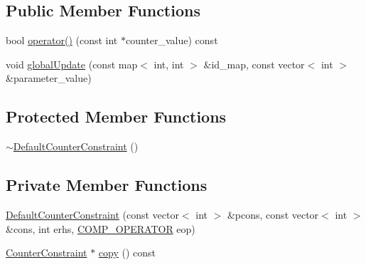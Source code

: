 \subsection*{Public Member Functions}
\begin{DoxyCompactItemize}
\item 
bool \mbox{\hyperlink{classgraphsat_1_1_default_counter_constraint_a0c7e9fd0402b59afdebfbc1764867aaa}{operator()}} (const int $\ast$counter\+\_\+value) const
\item 
void \mbox{\hyperlink{classgraphsat_1_1_default_counter_constraint_a5f131f57aa2685073391c372405322dd}{global\+Update}} (const map$<$ int, int $>$ \&id\+\_\+map, const vector$<$ int $>$ \&parameter\+\_\+value)
\end{DoxyCompactItemize}
\subsection*{Protected Member Functions}
\begin{DoxyCompactItemize}
\item 
\mbox{\hyperlink{classgraphsat_1_1_default_counter_constraint_aafe9f228a3ea6a39fc70ece8b9300875}{$\sim$\+Default\+Counter\+Constraint}} ()
\end{DoxyCompactItemize}
\subsection*{Private Member Functions}
\begin{DoxyCompactItemize}
\item 
\mbox{\hyperlink{classgraphsat_1_1_default_counter_constraint_ae77bcab173109e73923e98a5d1694d70}{Default\+Counter\+Constraint}} (const vector$<$ int $>$ \&pcons, const vector$<$ int $>$ \&cons, int erhs, \mbox{\hyperlink{namespacegraphsat_acfb5939f9bdafbd9aea0d084b9a56f69}{C\+O\+M\+P\+\_\+\+O\+P\+E\+R\+A\+T\+OR}} eop)
\item 
\mbox{\hyperlink{classgraphsat_1_1_counter_constraint}{Counter\+Constraint}} $\ast$ \mbox{\hyperlink{classgraphsat_1_1_default_counter_constraint_a5a5b4fcebd097f209ebdebcde1a7321f}{copy}} () const
\end{DoxyCompactItemize}
